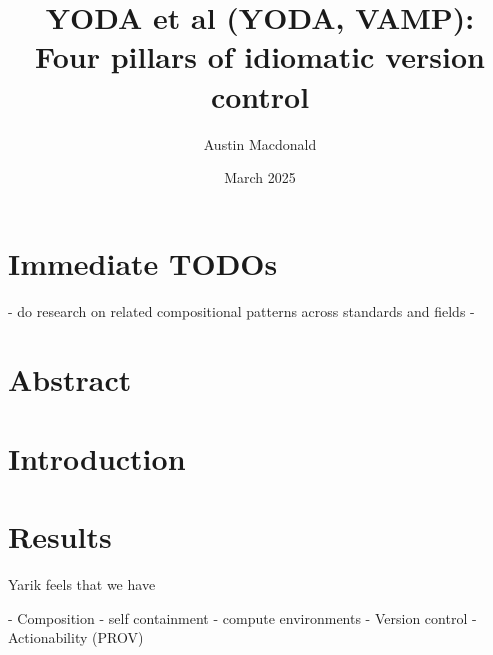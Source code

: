 \documentclass{article}
\title{YODA et al (YODA, VAMP): Four pillars of idiomatic version control}
\author{Austin Macdonald}
\date{March 2025}
\begin{document}
\maketitle

\section{Immediate TODOs}

- do research on related compositional patterns across standards and fields
- 

\section{Abstract}


\section{Introduction}



\section{Results}



Yarik feels that we have

- Composition
 - self containment
 - compute environments 
- Version control
- Actionability (PROV)
\end{document}
